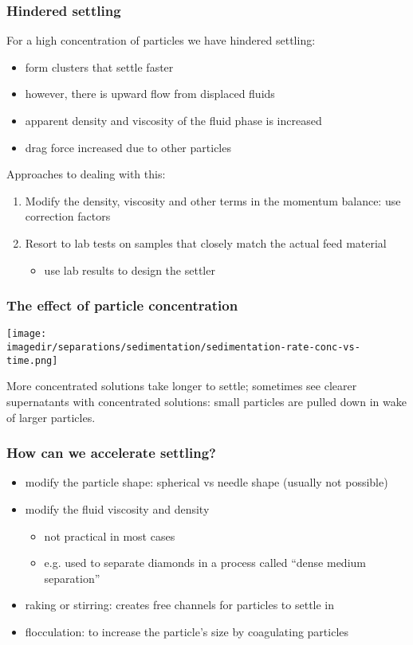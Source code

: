 \begin{frame}\frametitle{Hindered settling}
	For a high concentration of particles we have hindered settling:
	\begin{itemize}
		\item	form clusters that settle faster
		\item	however, there is upward flow from displaced fluids
		\item	apparent density and viscosity of the fluid phase is increased
		\item	drag force increased due to other particles
	\end{itemize}
	
	\vspace{12pt}
	Approaches to dealing with this:
	\begin{enumerate}
		\item	Modify the density, viscosity and other terms in the momentum balance: use correction factors
		\item	Resort to lab tests on samples that closely match the actual feed material
		\begin{itemize}
			\item	use lab results to design the settler
		\end{itemize}
	\end{enumerate}
\end{frame}

\begin{frame}\frametitle{The effect of particle concentration}
	\begin{center}
		\texttt{[image: \\imagedir/separations/sedimentation/sedimentation-rate-conc-vs-time.png]}
	\end{center}
	
	More concentrated solutions take longer to settle; sometimes see clearer supernatants with concentrated solutions: small particles are pulled down in wake of larger particles.
\end{frame}

\begin{frame}\frametitle{How can we accelerate settling?}
	\begin{itemize}
		\item	modify the particle shape: spherical vs needle shape (usually not possible)
		\item	modify the fluid viscosity and density 
		\begin{itemize}
			\item	not practical in most cases
			\item	e.g. used to separate diamonds in a process called ``dense medium separation''
		\end{itemize}
		\item	raking or stirring: creates free channels for particles to settle in
		\item	flocculation: to increase the particle's size by coagulating particles
	\end{itemize}
\end{frame}

